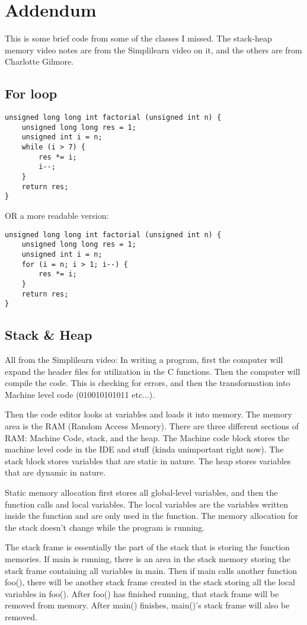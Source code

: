 \documentclass[12pt]{article}
\theoremstyle{definition}
\begin{document}
\section{Addendum}
This is some brief code from some of the classes I missed. The stack-heap memory video notes are from the Simplilearn video on it, and the others are from Charlotte Gilmore. 
\newpage
\subsection{For loop}
\begin{lstlisting}
unsigned long long int factorial (unsigned int n) {
    unsigned long long res = 1;
    unsigned int i = n;
    while (i > 7) {
        res *= i;
        i--;
    }
    return res;
}
\end{lstlisting}
OR a more readable version: 

\begin{lstlisting}
unsigned long long int factorial (unsigned int n) {
    unsigned long long res = 1;
    unsigned int i = n;
    for (i = n; i > 1; i--) {
        res *= i;
    }
    return res;
}
\end{lstlisting}

\subsection{Stack \& Heap}
All from the Simplilearn video:
In writing a program, first the computer will expand the header files for utilization in the C functions. Then the computer will compile the code. This is checking for errors, and then the transformation into Machine level code (010010101011 etc...). 

Then the code editor looks at variables and loads it into memory. The memory area is the RAM (Random Access Memory). There are three different sections of RAM: Machine Code, stack, and the heap. The Machine code block stores the machine level code in the IDE and stuff (kinda unimportant right now). The stack block stores variables that are static in nature. The heap stores variables that are dynamic in nature. 

Static memory allocation first stores all global-level variables, and then the function calls and local variables. The local variables are the variables written inside the function and are only used in the function. The memory allocation for the stack doesn't change while the program is running. 

The stack frame is essentially the part of the stack that is storing the function memories. If main is running, there is an area in the stack memory storing the stack frame containing all variables in main. Then if main calls another function foo(), there will be another stack frame created in the stack storing all the local variables in foo(). After foo() has finished running, that stack frame will be removed from memory. After main() finishes, main()'s stack frame will also be removed. 
\end{document}
